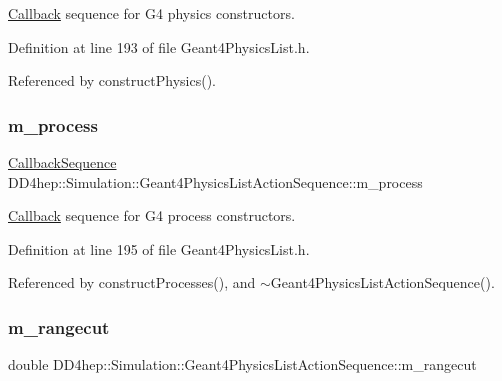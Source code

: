 \hyperlink{class_d_d4hep_1_1_callback}{Callback} sequence for G4 physics constructors. 



Definition at line 193 of file Geant4\+Physics\+List.\+h.



Referenced by construct\+Physics().

\hypertarget{class_d_d4hep_1_1_simulation_1_1_geant4_physics_list_action_sequence_ae2f6d60bc1654668ee661e9010b5fa82}{}\label{class_d_d4hep_1_1_simulation_1_1_geant4_physics_list_action_sequence_ae2f6d60bc1654668ee661e9010b5fa82} 
\subsubsection{\texorpdfstring{m\+\_\+process}{m\_process}}
{\footnotesize\ttfamily \hyperlink{struct_d_d4hep_1_1_callback_sequence}{Callback\+Sequence} D\+D4hep\+::\+Simulation\+::\+Geant4\+Physics\+List\+Action\+Sequence\+::m\+\_\+process\hspace{0.3cm}{\ttfamily [protected]}}



\hyperlink{class_d_d4hep_1_1_callback}{Callback} sequence for G4 process constructors. 



Definition at line 195 of file Geant4\+Physics\+List.\+h.



Referenced by construct\+Processes(), and $\sim$\+Geant4\+Physics\+List\+Action\+Sequence().

\hypertarget{class_d_d4hep_1_1_simulation_1_1_geant4_physics_list_action_sequence_a125a5acaa8915ef45d5832351ce3a9df}{}\label{class_d_d4hep_1_1_simulation_1_1_geant4_physics_list_action_sequence_a125a5acaa8915ef45d5832351ce3a9df} 
\subsubsection{\texorpdfstring{m\+\_\+rangecut}{m\_rangecut}}
{\footnotesize\ttfamily double D\+D4hep\+::\+Simulation\+::\+Geant4\+Physics\+List\+Action\+Sequence\+::m\+\_\+rangecut}



